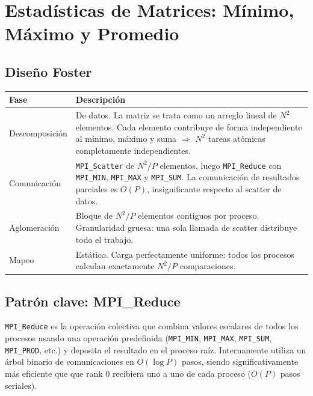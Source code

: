 \documentclass[12pt,a4paper]{article}
\begin{document}
\section{Estadísticas de Matrices: Mínimo, Máximo y Promedio}

\subsection{Diseño Foster}

\begin{tabular}{L{3cm} L{11cm}}
\toprule
\textbf{Fase} & \textbf{Descripción} \\
\midrule
Descomposición & De datos. La matriz se trata como un arreglo lineal de $N^2$
  elementos. Cada elemento contribuye de forma independiente al mínimo, máximo
  y suma $\Rightarrow$ $N^2$ tareas atómicas completamente independientes. \\[4pt]
Comunicación & \texttt{MPI\_Scatter} de $N^2/P$ elementos, luego
  \texttt{MPI\_Reduce} con \texttt{MPI\_MIN}, \texttt{MPI\_MAX} y \texttt{MPI\_SUM}.
  La comunicación de resultados parciales es $O(P)$, insignificante respecto
  al scatter de datos. \\[4pt]
Aglomeración & Bloque de $N^2/P$ elementos contiguos por proceso. Granularidad
  gruesa: una sola llamada de scatter distribuye todo el trabajo. \\[4pt]
Mapeo & Estático. Carga perfectamente uniforme: todos los procesos calculan
  exactamente $N^2/P$ comparaciones. \\
\bottomrule
\end{tabular}

\vspace{0.5cm}

\subsection{Patrón clave: MPI\_Reduce}

\texttt{MPI\_Reduce} es la operación colectiva que combina valores escalares de todos
los procesos usando una operación predefinida (\texttt{MPI\_MIN}, \texttt{MPI\_MAX},
\texttt{MPI\_SUM}, \texttt{MPI\_PROD}, etc.) y deposita el resultado en el proceso
raíz. Internamente utiliza un árbol binario de comunicaciones en $O(\log P)$ pasos,
siendo significativamente más eficiente que que rank 0 recibiera uno a uno de cada
proceso ($O(P)$ pasos seriales).
\end{document}
